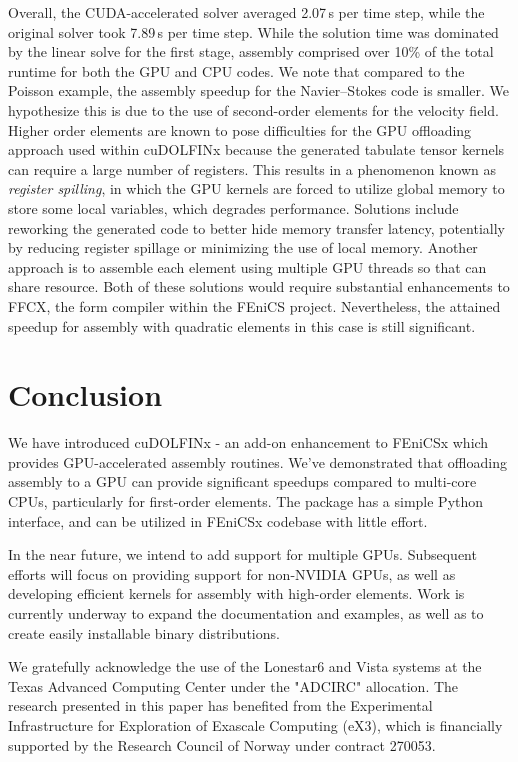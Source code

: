 Overall, the CUDA-accelerated solver averaged 2.07\,s per time step, while the original solver took 7.89\,s per time step. While the solution time was dominated by the linear solve for the first stage, assembly comprised over 10\% of the total runtime for both the GPU and CPU codes. We note that compared to the Poisson example, the assembly speedup for the Navier--Stokes code is smaller. We hypothesize this is due to the use of second-order elements for the velocity field. Higher order elements are known to pose difficulties for the GPU offloading approach used within cuDOLFINx because the generated tabulate tensor kernels can require a large number of registers. This results in a phenomenon known as \textit{register spilling}, in which the GPU kernels are forced to utilize global memory to store some local variables, which degrades performance. Solutions include reworking the generated code to better hide memory transfer latency, potentially by reducing register spillage or minimizing the use of local memory. Another approach is to assemble each element using multiple GPU threads so that can share resource. Both of these solutions would require substantial enhancements to FFCX, the form compiler within the FEniCS project. Nevertheless, the attained speedup for assembly with quadratic elements in this case is still significant.

\section*{Conclusion}

We have introduced cuDOLFINx - an add-on enhancement to FEniCSx which provides GPU-accelerated assembly routines. We've demonstrated that offloading assembly to a GPU can provide significant speedups compared to multi-core CPUs, particularly for first-order elements. The package has a simple Python interface, and can be utilized in FEniCSx codebase with little effort.

In the near future, we intend to add support for multiple GPUs. Subsequent efforts will focus on providing support for non-NVIDIA GPUs, as well as developing efficient kernels for assembly with high-order elements. Work is currently underway to expand the documentation and examples, as well as to create easily installable binary distributions.



\begin{acknowledgement}
  We gratefully acknowledge the use of the Lonestar6 and Vista systems at the Texas Advanced Computing Center under the "ADCIRC" allocation.
The research presented in this paper has benefited from the Experimental Infrastructure for Exploration of Exascale Computing (eX3), which is financially supported by the Research Council of Norway under contract 270053.
\end{acknowledgement}



